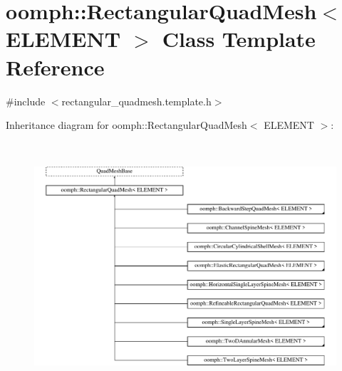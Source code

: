 \hypertarget{classoomph_1_1RectangularQuadMesh}{}\section{oomph\+:\+:Rectangular\+Quad\+Mesh$<$ E\+L\+E\+M\+E\+NT $>$ Class Template Reference}
\label{classoomph_1_1RectangularQuadMesh}


{\ttfamily \#include $<$rectangular\+\_\+quadmesh.\+template.\+h$>$}

Inheritance diagram for oomph\+:\+:Rectangular\+Quad\+Mesh$<$ E\+L\+E\+M\+E\+NT $>$\+:\begin{figure}[H]
\begin{center}
\leavevmode
\includegraphics[height=9.194030cm]{classoomph_1_1RectangularQuadMesh}
\end{center}
\end{figure}
